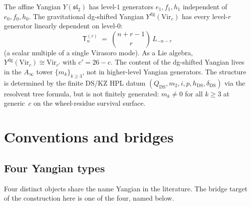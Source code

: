 \begin{remark}
\label{rem:gravitational-yangian-collapse}
The affine Yangian $Y(\mathfrak{sl}_2)$ has level-$1$ generators
$e_1, f_1, h_1$ independent of $e_0, f_0, h_0$. The gravitational
dg-shifted Yangian $Y^{\mathrm{dg}}(\mathrm{Vir}_c)$ has every
level-$r$ generator linearly dependent on level-$0$:
\[
\mathsf{T}_n^{(r)} \;=\; \binom{n+r-1}{r}\,L_{-n-r}
\]
\textup{(}a scalar multiple of a single Virasoro mode\textup{)}.
As a Lie algebra, $Y^{\mathrm{dg}}(\mathrm{Vir}_c) \cong
\mathrm{Vir}_{c'}$ with $c' = 26 - c$. The content of the dg-shifted
Yangian lives in the $A_\infty$ tower $\{m_k\}_{k \ge 3}$, not in
higher-level Yangian generators. The structure is determined by the
finite DS/KZ HPL datum
$(Q_{\mathrm{DS}},m_2,i,p,h_{\mathrm{DS}},\delta_{\mathrm{DS}})$
via the resolvent tree formula, but is not finitely generated:
$m_k \ne 0$ for all $k \ge 3$ at generic~$c$ on the wheel-residue
survival surface.
\end{remark}

\section{Conventions and bridges}
\label{sec:dg-shifted-bridge-conventions}

\subsection{Four Yangian types}
\label{subsec:dg-shifted-bridge-yangian-types}

Four distinct objects share the name Yangian in the literature. The
bridge target of the construction here is one of the four, named
below.


